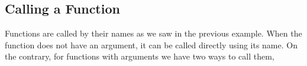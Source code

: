 \documentclass[11pt, a4paper]{article}
\begin{document}
\subsection{Calling a Function}
Functions are called by their names as we saw in the previous example.
When the function does not have an argument,
it can be called directly using its name. On the contrary, for functions with
arguments we have two ways to call them,
\end{document}

